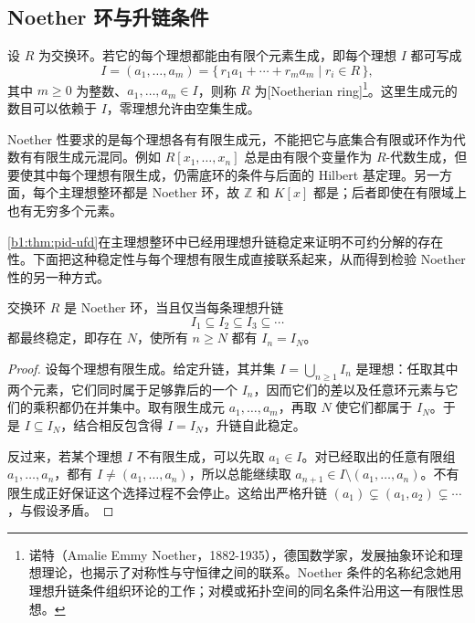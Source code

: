 \subsection{Noether 环与升链条件}
\label{b1:subsec:1204:02}

\begin{definition}\label{b1:def:noetherian-ring}
	设 \(R\) 为交换环。若它的每个理想都能由有限个元素生成，即每个理想 \(I\) 都可写成
	\[
		I=(a_1,\ldots,a_m)=\{\,r_1a_1+\cdots+r_ma_m\mid r_i\in R\,\},
	\]
	其中 \(m\geq0\) 为整数、\(a_1,\ldots,a_m\in I\)，则称 \(R\) 为[Noetherian ring]\footnote{诺特（Amalie Emmy Noether，1882-1935），德国数学家，发展抽象环论和理想理论，也揭示了对称性与守恒律之间的联系。Noether 条件的名称纪念她用理想升链条件组织环论的工作；对模或拓扑空间的同名条件沿用这一有限性思想。}。这里生成元的数目可以依赖于 \(I\)，零理想允许由空集生成。
\end{definition}

Noether 性要求的是每个理想各有有限生成元，不能把它与底集合有限或环作为代数有有限生成元混同。例如 \(R[x_1,\ldots,x_n]\) 总是由有限个变量作为 \(R\)-代数生成，但要使其中每个理想有限生成，仍需底环的条件与后面的 Hilbert 基定理。另一方面，每个主理想整环都是 Noether 环，故 \(\mathbb Z\) 和 \(K[x]\) 都是；后者即使在有限域上也有无穷多个元素。

\ProseParagraphBreak
\cref{b1:thm:pid-ufd}在主理想整环中已经用理想升链稳定来证明不可约分解的存在性。下面把这种稳定性与每个理想有限生成直接联系起来，从而得到检验 Noether 性的另一种方式。

\begin{proposition}\label{b1:prop:noetherian-acc}
	交换环 \(R\) 是 Noether 环，当且仅当每条理想升链
	\[
		I_1\subseteq I_2\subseteq I_3\subseteq\cdots
	\]
	都最终稳定，即存在 \(N\)，使所有 \(n\ge N\) 都有 \(I_n=I_N\)。
\end{proposition}
\begin{proof}
	设每个理想有限生成。给定升链，其并集 \(I=\bigcup_{n\ge1}I_n\) 是理想：任取其中两个元素，它们同时属于足够靠后的一个 \(I_n\)，因而它们的差以及任意环元素与它们的乘积都仍在并集中。取有限生成元 \(a_1,\ldots,a_m\)，再取 \(N\) 使它们都属于 \(I_N\)。于是 \(I\subseteq I_N\)，结合相反包含得 \(I=I_N\)，升链自此稳定。

	反过来，若某个理想 \(I\) 不有限生成，可以先取 \(a_1\in I\)。对已经取出的任意有限组 \(a_1,\ldots,a_n\)，都有 \(I\ne(a_1,\ldots,a_n)\)，所以总能继续取 \(a_{n+1}\in I\setminus(a_1,\ldots,a_n)\)。不有限生成正好保证这个选择过程不会停止。这给出严格升链 \((a_1)\subsetneq(a_1,a_2)\subsetneq\cdots\)，与假设矛盾。
\end{proof}

